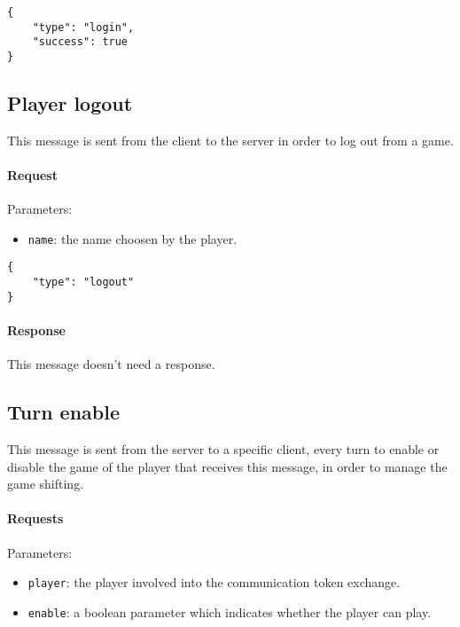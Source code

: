 \documentclass[a4paper]{article}
\begin{document}
	\begin{verbatim}
{
	"type": "login",
	"success": true
}
	\end{verbatim}

	\subsection{Player logout}

	This message is sent from the client to the server in order to log out from a game.

	\paragraph{Request} Parameters:

	\begin{itemize}
		\item \verb|name|: the name choosen by the player.
	\end{itemize}

	\begin{verbatim}
{
	"type": "logout"
}
	\end{verbatim}

	\paragraph{Response} This message doesn't need a response.

	\subsection{Turn enable}

	This message is sent from the server to a specific client, every turn to enable or disable the game of the player that receives this message, in order to manage the game shifting.

	\paragraph{Requests} Parameters:

	\begin{itemize}
		\item \verb|player|: the player involved into the communication token exchange.
		\item \verb|enable|: a boolean parameter which indicates whether the player can play.
	\end{itemize}
\end{document}
